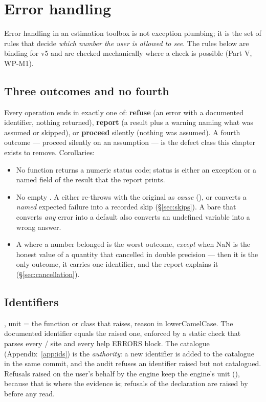 \chapter{Error handling}
\label{ch:errors}

Error handling in an estimation toolbox is not exception plumbing; it is the set of rules that decide \emph{which number the user is allowed to see}. The rules below are binding for v5 and are checked mechanically where a check is possible (Part V, WP-M1).

\section{Three outcomes and no fourth}

Every operation ends in exactly one of: \textbf{refuse} (an error with a documented identifier, nothing returned), \textbf{report} (a result plus a warning naming what was assumed or skipped), or \textbf{proceed} silently (nothing was assumed). A fourth outcome --- proceed silently on an assumption --- is the defect class this chapter exists to remove. Corollaries:
\begin{itemize}
\item No function returns a numeric status code; status is either an exception or a named field of the result that the report prints.
\item No empty . A  either re-throws with the original as \emph{cause} (), or converts a \emph{named} expected failure into a recorded skip (\S\ref{sec:skips}). A bare  that converts \emph{any} error into a default also converts an undefined variable into a wrong answer.
\item A  where a number belonged is the worst outcome, \emph{except} when NaN is the honest value of a quantity that cancelled in double precision --- then it is the only outcome, it carries one identifier, and the report explains it (\S\ref{sec:cancellation}).
\end{itemize}

\section{Identifiers}

, unit = the function or class that raises, reason in lowerCamelCase. The documented identifier equals the raised one, enforced by a static check that parses every / site and every help ERRORS block. The catalogue (Appendix~\ref{app:ids}) is the \emph{authority}: a new identifier is added to the catalogue in the same commit, and the audit refuses an identifier raised but not catalogued. Refusals raised on the user's behalf by the engine keep the engine's unit (), because that is where the evidence is; refusals of the declaration are raised by  before any read.


